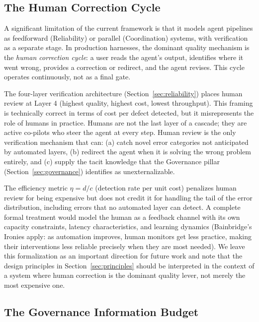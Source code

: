 \documentclass[11pt, a4paper, logo, copyright]{googledeepmind}
\begin{document}
\subsection{The Human Correction Cycle}
\label{sec:human-loop}

A significant limitation of the current framework is that it models agent pipelines as feedforward (Reliability) or parallel (Coordination) systems, with verification as a separate stage. In production harnesses, the dominant quality mechanism is the \emph{human correction cycle}: a user reads the agent's output, identifies where it went wrong, provides a correction or redirect, and the agent revises. This cycle operates continuously, not as a final gate.

The four-layer verification architecture (Section~\ref{sec:reliability}) places human review at Layer 4 (highest quality, highest cost, lowest throughput). This framing is technically correct in terms of cost per defect detected, but it misrepresents the role of humans in practice. Humans are not the last layer of a cascade; they are active co-pilots who steer the agent at every step. Human review is the only verification mechanism that can: (a) catch novel error categories not anticipated by automated layers, (b) redirect the agent when it is solving the wrong problem entirely, and (c) supply the tacit knowledge that the Governance pillar (Section~\ref{sec:governance}) identifies as unexternalizable.

The efficiency metric $\eta = d/c$ (detection rate per unit cost) penalizes human review for being expensive but does not credit it for handling the tail of the error distribution, including errors that no automated layer can detect. A complete formal treatment would model the human as a feedback channel with its own capacity constraints, latency characteristics, and learning dynamics (Bainbridge's Ironies apply: as automation improves, human monitors get less practice, making their interventions less reliable precisely when they are most needed). We leave this formalization as an important direction for future work and note that the design principles in Section~\ref{sec:principles} should be interpreted in the context of a system where human correction is the dominant quality lever, not merely the most expensive one.

\subsection{The Governance Information Budget}
\label{sec:gib}
\end{document}
